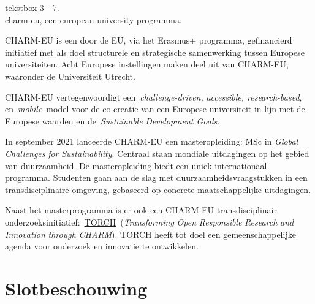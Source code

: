 \documentclass{jote-book}
\begin{document}
	\begin{bookbox}{\raggedright tekstbox 3 - 7. \\charm-eu, een european university programma.}
		CHARM-EU is een door de EU, via het Erasmus+ programma, gefinancierd initiatief met als doel structurele en strategische samenwerking tussen Europese universiteiten. Acht Europese instellingen maken deel uit van CHARM-EU, waaronder de Universiteit Utrecht.

		\vspace*{\baselineskip}

		CHARM-EU vertegenwoordigt een \emph{challenge-driven}\emph{, }\emph{accessible}\emph{, research-}\emph{based}, en \emph{mobile} model voor de co-creatie van een Europese universiteit in lijn met de Europese waarden en de \emph{Sustainable}\emph{ Development Goals}.

		\vspace*{\baselineskip}

		In september 2021 lanceerde CHARM-EU een masteropleiding: MSc in \emph{Global }\emph{Challenges}\emph{ }\emph{for}\emph{ }\emph{Sustainability}. Centraal staan mondiale uitdagingen op het gebied van duurzaamheid. De masteropleiding biedt een uniek internationaal programma. Studenten gaan aan de slag met duurzaamheidsvraagstukken in een transdisciplinaire omgeving, gebaseerd op concrete maatschappelijke uitdagingen.

		\vspace*{\baselineskip}

		Naast het masterprogramma is er ook een CHARM-EU transdisciplinair onderzoeksinitiatief: \href{https://www.charm-eu.eu/torch}{TORCH} (\emph{Transforming}\emph{ Open }\emph{Responsible}\emph{ Research }\emph{and}\emph{ }\emph{Innovation}\emph{ }\emph{through}\emph{ CHARM}). TORCH heeft tot doel een gemeenschappelijke agenda voor onderzoek en innovatie te ontwikkelen.
	\end{bookbox}

	\section{Slotbeschouwing}
\end{document}
